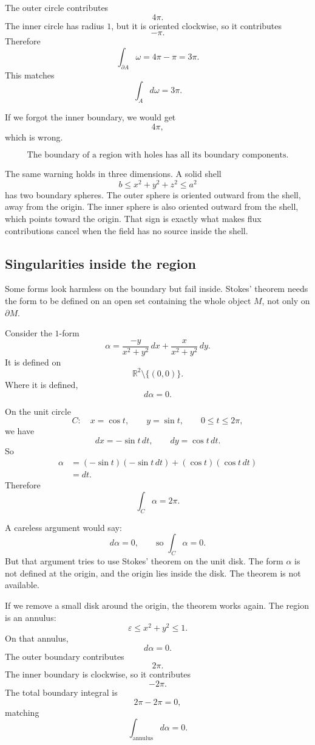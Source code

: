 The outer circle contributes
\[
    4\pi.
\]
The inner circle has radius \(1\), but it is oriented clockwise, so it contributes
\[
    -\pi.
\]
Therefore
\[
\boxed{
    \int_{\partial A}\omega=4\pi-\pi=3\pi.
}
\]
This matches
\[
    \int_A d\omega=3\pi.
\]

If we forgot the inner boundary, we would get
\[
    4\pi,
\]
which is wrong.

\[
\boxed{
    \text{The boundary of a region with holes has all its boundary components.}
}
\]

The same warning holds in three dimensions.  A solid shell
\[
    b\le x^2+y^2+z^2\le a^2
\]
has two boundary spheres.  The outer sphere is oriented outward from the shell, away
from the origin.  The inner sphere is also oriented outward from the shell, which points
toward the origin.  That sign is exactly what makes flux contributions cancel when the
field has no source inside the shell.

\subsection{Singularities inside the region}

Some forms look harmless on the boundary but fail inside.  Stokes' theorem needs the
form to be defined on an open set containing the whole object \(M\), not only on
\(\partial M\).

Consider the \(1\)-form
\[
    \alpha=
    \frac{-y}{x^2+y^2}\,dx+
    \frac{x}{x^2+y^2}\,dy.
\]
It is defined on
\[
    \mathbb R^2\setminus\{(0,0)\}.
\]
Where it is defined,
\[
    d\alpha=0.
\]

On the unit circle
\[
    C:\quad x=\cos t,\qquad y=\sin t,
    \qquad 0\le t\le2\pi,
\]
we have
\[
    dx=-\sin t\,dt,
    \qquad
    dy=\cos t\,dt.
\]
So
\[
\begin{aligned}
    \alpha
    &=
    (-\sin t)(-\sin t\,dt)+(\cos t)(\cos t\,dt)\\
    &=
    dt.
\end{aligned}
\]
Therefore
\[
\boxed{
    \int_C\alpha=2\pi.
}
\]

A careless argument would say:
\[
    d\alpha=0,
    \qquad
    \text{so }
    \int_C\alpha=0.
\]
But that argument tries to use Stokes' theorem on the unit disk.  The form \(\alpha\)
is not defined at the origin, and the origin lies inside the disk.  The theorem is not
available.

If we remove a small disk around the origin, the theorem works again.  The region is
an annulus:
\[
    \varepsilon\le x^2+y^2\le1.
\]
On that annulus,
\[
    d\alpha=0.
\]
The outer boundary contributes
\[
    2\pi.
\]
The inner boundary is clockwise, so it contributes
\[
    -2\pi.
\]
The total boundary integral is
\[
    2\pi-2\pi=0,
\]
matching
\[
    \int_{\text{annulus}}d\alpha=0.
\]

